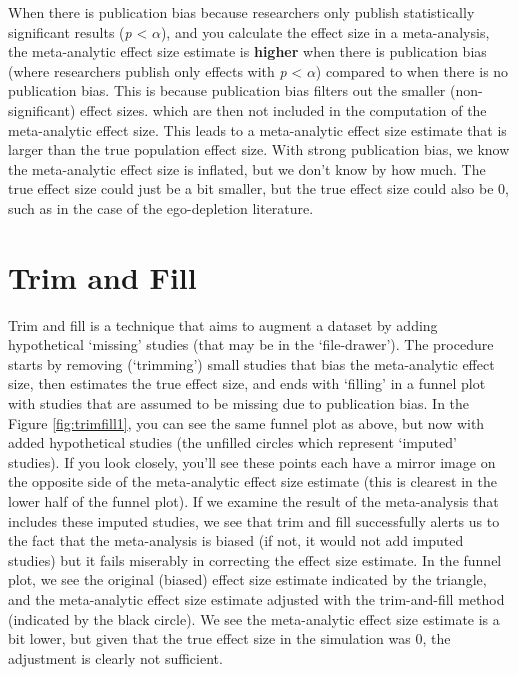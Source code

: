 \documentclass[
  oneside]{krantz}
\begin{document}
When there is publication bias because researchers only publish statistically significant results (\emph{p} \textless{} \(\alpha\)), and you calculate the effect size in a meta-analysis, the meta-analytic effect size estimate is \textbf{higher} when there is publication bias (where researchers publish only effects with \emph{p} \textless{} \(\alpha\)) compared to when there is no publication bias. This is because publication bias filters out the smaller (non-significant) effect sizes. which are then not included in the computation of the meta-analytic effect size. This leads to a meta-analytic effect size estimate that is larger than the true population effect size. With strong publication bias, we know the meta-analytic effect size is inflated, but we don't know by how much. The true effect size could just be a bit smaller, but the true effect size could also be 0, such as in the case of the ego-depletion literature.

\hypertarget{trim-and-fill}{%
\section{Trim and Fill}\label{trim-and-fill}}

Trim and fill is a technique that aims to augment a dataset by adding hypothetical `missing' studies (that may be in the `file-drawer'). The procedure starts by removing (`trimming') small studies that bias the meta-analytic effect size, then estimates the true effect size, and ends with `filling' in a funnel plot with studies that are assumed to be missing due to publication bias. In the Figure \ref{fig:trimfill1}, you can see the same funnel plot as above, but now with added hypothetical studies (the unfilled circles which represent `imputed' studies). If you look closely, you'll see these points each have a mirror image on the opposite side of the meta-analytic effect size estimate (this is clearest in the lower half of the funnel plot). If we examine the result of the meta-analysis that includes these imputed studies, we see that trim and fill successfully alerts us to the fact that the meta-analysis is biased (if not, it would not add imputed studies) but it fails miserably in correcting the effect size estimate. In the funnel plot, we see the original (biased) effect size estimate indicated by the triangle, and the meta-analytic effect size estimate adjusted with the trim-and-fill method (indicated by the black circle). We see the meta-analytic effect size estimate is a bit lower, but given that the true effect size in the simulation was 0, the adjustment is clearly not sufficient.
\end{document}
